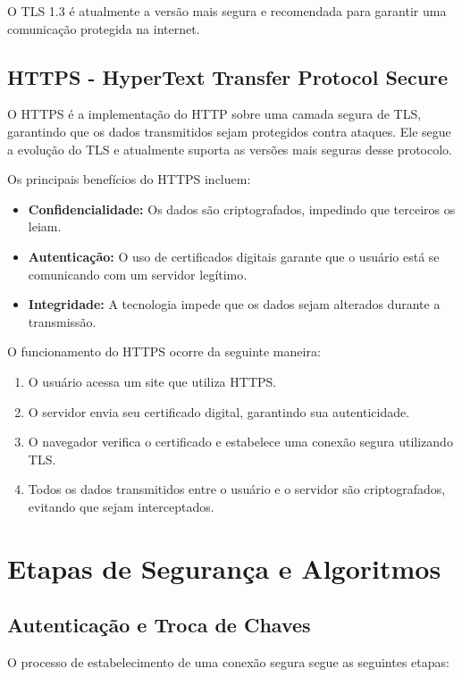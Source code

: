 \documentclass[a4paper,12pt]{article}
\begin{document}
O TLS 1.3 é atualmente a versão mais segura e recomendada para garantir uma comunicação protegida na internet.

\subsection{HTTPS - HyperText Transfer Protocol Secure}
O HTTPS é a implementação do HTTP sobre uma camada segura de TLS, garantindo que os dados transmitidos sejam protegidos contra ataques. Ele segue a evolução do TLS e atualmente suporta as versões mais seguras desse protocolo.

Os principais benefícios do HTTPS incluem:
\begin{itemize}
\item \textbf{Confidencialidade:} Os dados são criptografados, impedindo que terceiros os leiam.
\item \textbf{Autenticação:} O uso de certificados digitais garante que o usuário está se comunicando com um servidor legítimo.
\item \textbf{Integridade:} A tecnologia impede que os dados sejam alterados durante a transmissão.
\end{itemize}

O funcionamento do HTTPS ocorre da seguinte maneira:
\begin{enumerate}
\item O usuário acessa um site que utiliza HTTPS.
\item O servidor envia seu certificado digital, garantindo sua autenticidade.
\item O navegador verifica o certificado e estabelece uma conexão segura utilizando TLS.
\item Todos os dados transmitidos entre o usuário e o servidor são criptografados, evitando que sejam interceptados.
\end{enumerate}

\section{Etapas de Segurança e Algoritmos}

\subsection{Autenticação e Troca de Chaves}
O processo de estabelecimento de uma conexão segura segue as seguintes etapas:
\end{document}
